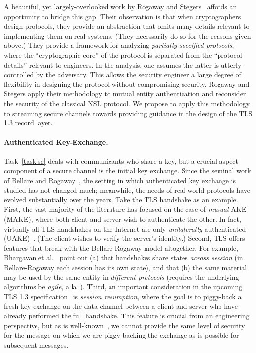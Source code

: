 \begin{task}\label{task:sc}
  A beautiful, yet largely-overlooked work by Rogaway and Stegers~\cite{RS09}
  affords an opportunity to bridge this gap. Their observation is that when
  cryptographers design protocols, they provide an abstraction that omits many
  details relevant to implementing them on real systems. (They necessarily do
  so for the reasons given above.)
  They provide a framework for analyzing \emph{partially-specified protocols},
  where the ``cryptographic core'' of the protocol is separated from the
  ``protocol details'' relevant to engineers. In the analysis, one assumes the
  latter is utterly controlled by the adversary. This  allows the security
  engineer a large degree of flexibility in designing the protocol without
  compromising security.
  Rogaway and Stegers apply their methodology to mutual entity authentication
  and reconsider the security of the classical NSL
  protocol.
  We propose to apply this methodology to streaming secure channels towards
  providing guidance in the design of the TLS 1.3 record layer.
\end{task}

\paragraph{Authenticated Key-Exchange. }
%
Task~\ref{task:sc} deals with communicants who share a key, but a crucial aspect
component of a secure channel is the initial key exchange.
%
Since the seminal work of Bellare and Rogaway~\cite{BR93}, the setting in which
authenticated key exchange is studied has not changed much; meanwhile, the needs of
real-world protocols have evolved substantially over the years. Take the TLS
handshake  as an example.
%
First, the vast majority of the literature has focused on the case of
\emph{mutual} AKE (MAKE), where both client and server wish to authenticate
the other. In fact, virtually all TLS handshakes on the Internet are only
\emph{unilaterally} authenticated (UAKE)~\cite{xxx}. (The client wishes to
verify the server's identity.)
%
Second, TLS offers features that break with the Bellare-Rogaway model
altogether. For example, Bhargavan et al.~\cite{bhargavan2014proving} point
out (a) that handshakes share states \emph{across session} (in
Bellare-Rogaway each session has its own state), and that (b) the same
material may be used by the same entity in \emph{different protocols}
(requires the underlying algorithms be \emph{agile}, a
la~\cite{acar2010cryptographic}).
%
Third, an important consideration in the upcoming TLS 1.3
specification~\cite{tls13} is \emph{session resumption}, where the goal is
to piggy-back a fresh key exchange on the data channel between a client and
server who have already performed the full handshake. This feature is
crucial from an engineering perspective, but as is well-known~\cite{xxx}, we
cannot provide the same level of security for the message on which we are
piggy-backing the exchange as is possible for subsequent messages.

